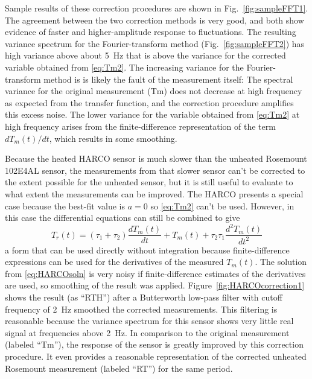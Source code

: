 \documentclass[11pt,twoside,american,12pt,twoside,american]{article}\usepackage[]{graphicx}\usepackage[]{color}
\begin{document}
Sample results of these correction procedures are shown in Fig.~\ref{fig:sampleFFT1}.
The agreement between the two correction methods is very good, and
both show evidence of faster and higher-amplitude response to fluctuations.
The resulting variance spectrum for the Fourier-transform method (Fig.~\ref{fig:sampleFFT2})
has high variance above about 5~Hz that is above the variance for
the corrected variable obtained from \eqref{eq:Tm2}. The increasing
variance for the Fourier-transform method is is likely the fault of
the measurement itself: The spectral variance for the original measurement
(Tm) does not decrease at high frequency as expected from the transfer
function, and the correction procedure amplifies this excess noise.
The lower variance for the variable obtained from \eqref{eq:Tm2}
at high frequency arises from the finite-difference representation
of the term $dT_{m}(t)/dt$, which results in some smoothing.

Because the heated HARCO sensor is much slower than the unheated
Rosemount 102E4AL sensor, the measurements from that slower sensor
can't be corrected to the extent possible for the unheated sensor,
but it is still useful to evaluate to what extent the measurements
can be improved. The HARCO presents a special case because the best-fit
value is $a=0$ so \eqref{eq:Tm2} can't be used. However, in this
case the differential equations can still be combined to give\\
\begin{equation}
T_{r}(t)=(\tau_{1}+\tau_{2})\frac{dT_{m}(t)}{dt}+T_{m}(t)+\tau_{2}\tau_{1}\frac{d^{2}T_{m}(t)}{dt^{2}}\label{eq:HARCOsoln}
\end{equation}
a form that can be used directly without integration because finite-difference
expressions can be used for the derivatives of the measured $T_{m}(t)$.
The solution from \eqref{eq:HARCOsoln} is very noisy if finite-difference
estimates of the derivatives are used, so smoothing of the result
was applied. Figure~\ref{fig:HARCOcorrection1} shows the result
(as ``RTH'') after a Butterworth low-pass filter with cutoff frequency
of 2~Hz smoothed the corrected measurements. This filtering is reasonable
because the variance spectrum for this sensor shows very little real
signal at frequencies above 2~Hz. In comparison to the original measurement
(labeled ``Tm''), the response of the sensor is greatly improved
by this correction procedure. It even provides a reasonable representation
of the corrected unheated Rosemount measurement (labeled ``RT'')
for the same period.
\end{document}
